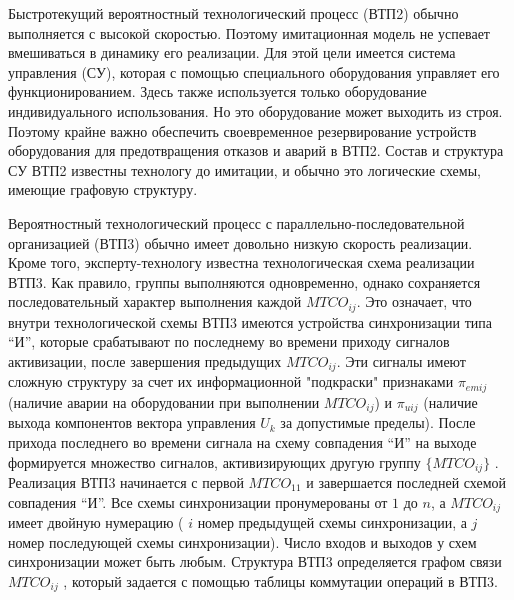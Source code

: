 Быстротекущий вероятностный технологический процесс (ВТП2) обычно выполняется с высокой скоростью. Поэтому имитационная модель не успевает вмешиваться в динамику его реализации. Для этой цели имеется система управления (СУ), которая с помощью специального оборудования управляет его функционированием. Здесь также используется только оборудование индивидуального использования. Но это оборудование может выходить из строя. Поэтому крайне важно обеспечить своевременное резервирование устройств оборудования для предотвращения отказов и аварий в ВТП2. Состав и структура СУ ВТП2 известны технологу до имитации, и обычно это логические схемы, имеющие графовую структуру.

Вероятностный технологический процесс с параллельно-последовательной организацией (ВТП3) обычно имеет довольно низкую скорость реализации. Кроме того, эксперту-технологу известна технологическая схема реализации ВТП3. Как правило, группы   выполняются одновременно, однако сохраняется последовательный характер выполнения каждой $MTCO_{ij}$. Это означает, что внутри технологической схемы ВТП3 имеются устройства синхронизации типа ``И'', которые срабатывают по последнему во времени приходу сигналов активизации, после завершения предыдущих $MTCO_{ij}$. Эти сигналы имеют сложную структуру за счет их информационной "подкраски"{} признаками $\pi_{emij}$ (наличие аварии на оборудовании при выполнении  $MTCO_{ij}$) и $\pi_{uij}$ (наличие выхода компонентов вектора управления ${U_k}$ за допустимые пределы). После прихода последнего во времени сигнала на схему совпадения ``И'' на выходе формируется множество сигналов, активизирующих другую группу $\{MTCO_{ij}\}$ . Реализация ВТП3 начинается с первой $MTCO_{11}$ и завершается последней схемой совпадения ``И''. Все схемы синхронизации пронумерованы от $1$ до $n$, а $MTCO_{ij}$ имеет двойную нумерацию ( $i$ номер предыдущей схемы синхронизации, а $j$ номер последующей схемы синхронизации). Число входов и выходов у схем синхронизации может быть любым. Структура ВТП3 определяется графом связи $MTCO_{ij}$ , который задается с помощью таблицы коммутации операций в ВТП3.


